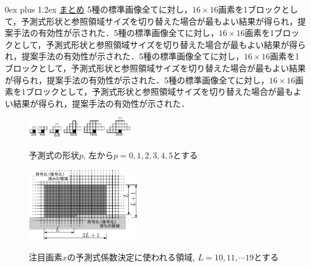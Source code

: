 \documentclass[9pt,dvipdfmx]{jsarticle}
\makeatletter
\def\section{\@startsection {section}{1}{\z@}
{1ex plus -1ex minus-.2ex}%
{0ex plus 1.2ex}%
 {\normalsize\bf}%
 }
\makeatother
\begin{document}
\section{\underline{まとめ}}
5種の標準画像全てに対し，$16\times 16$画素を1ブロックとして，予測式形状と参照領域サイズを切り替えた場合が最もよい結果が得られ，提案手法の有効性が示された．5種の標準画像全てに対し，$16\times 16$画素を1ブロックとして，予測式形状と参照領域サイズを切り替えた場合が最もよい結果が得られ，提案手法の有効性が示された．5種の標準画像全てに対し，$16\times 16$画素を1ブロックとして，予測式形状と参照領域サイズを切り替えた場合が最もよい結果が得られ，提案手法の有効性が示された．5種の標準画像全てに対し，$16\times 16$画素を1ブロックとして，予測式形状と参照領域サイズを切り替えた場合が最もよい結果が得られ，提案手法の有効性が示された．


\begin{figure}[t]
   \begin{center}
    \vspace{5mm}
   \includegraphics[width=0.4\textwidth]{fig/fig1.pdf}
   \caption{予測式の形状$p$, 左から$p=0,1,2,3,4,5$とする}
   \label{takago-paper2008080800268-fig:1}
%
   \vspace{2mm}
\includegraphics[width=0.43\textwidth]{fig/fig2.pdf}
\caption{注目画素$x$の予測式係数決定に使われる領域, $L=10,11,\cdots19$とする}
\label{takago-paper2008080800268-fig:2}
   \end{center}
\end{figure}
\end{document}
